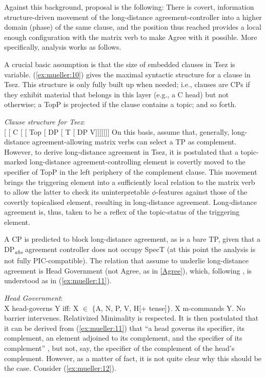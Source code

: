 \documentclass[output=paper
,modfonts
,nonflat]{langsci/langscibook}
\begin{document}
	Against this background,  proposal is
	the following: There is  covert, information structure-driven
	movement of the long-distance agreement-controller into a higher domain (phase) of the
	same clause, and the position thus reached provides a  local enough
	configuration with the matrix verb to make  Agree with it possible.
	More specifically,  analysis works as
	follows. 
	
	A crucial basic assumption is that the size of embedded clauses in
	Tsez is variable. (\ref{ex:mueller:10}) gives the maximal syntactic structure for a
	clause in Tsez. This structure is only fully  built up when needed;
	i.e., clauses are CPs if they exhibit material that belongs in this
	layer (e.g., a C head) but not otherwise; a TopP is projected if the
	clause contains a topic; and so forth. 
	
	\ea\label{ex:mueller:10} {\itshape Clause \label{Tsezstructure}structure for Tsez}:\\
	{[} [ C [ [ Top [ DP [ T [ DP V]]]]]]{]}
	\z
	On this  basis,  \cite{PolinskyPotsdam:01} assume that, generally, long-distance agreement-allowing matrix
	verbs can select a TP as complement. 
	However,  to derive long-distance agreement in Tsez, it is postulated
	that a   topic-marked long-distance agreement-controlling element is covertly moved to the
	specifier of TopP in the left periphery of the complement clause. 
	This movement brings the triggering element into a sufficiently
	local relation to the matrix verb to allow the latter to check its
	uninterpretable $\phi$-features against those of the covertly
	topicalised element, resulting in long-distance agreement.
	Long-distance agreement is, thus, taken to be a reflex of the topic-status of the
	triggering element. 
	
	A CP is predicted to block long-distance agreement, as is a bare TP,
	given that a DP\textsubscript{\textit{abs}} agreement controller does not occupy SpecT (at
	this point the analysis is not fully PIC-compatible). The relation
	that \cite{PolinskyPotsdam:01} assume to underlie long-distance
	agreement is  Head Government (not Agree, as in \ref{Agree}),
	which, following \cite{Rizzi:90}, is understood as in (\ref{ex:mueller:11}).
	
	\ea\label{ex:mueller:11} {\itshape Head Government}:\\
	X head-governs Y iff:
	\ea \label{list1}X $\in$ $\{$A, N, P, V, H[+{ tense}]$\}$.
	\ex X m-commands Y.
	\ex No barrier intervenes.
	\ex Relativized Minimality is respected. 
	\z
	\z
	It is then postulated that it can be derived from (\ref{ex:mueller:11}) that ``a head
	governs its specifier, its complement, an element adjoined to its
	complement, and the specifier of its complement''
	\citep[627]{PolinskyPotsdam:01}, but not, say, the specifier of
	the complement of the head's complement. However, as a matter of fact,
	it is not quite clear why this should be the case. Consider (\ref{ex:mueller:12}).
	
\end{document}
